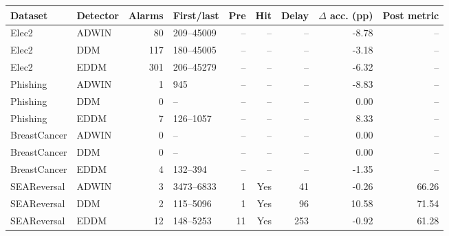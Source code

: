 \begin{tabular}{llrlrrrrr}
\toprule
Dataset & Detector & Alarms & First/last & Pre & Hit & Delay & $\Delta$ acc. (pp) & Post metric \\
\midrule
Elec2 & ADWIN & 80 & 209--45009 & -- & -- & -- & -8.78 & -- \\
Elec2 & DDM & 117 & 180--45005 & -- & -- & -- & -3.18 & -- \\
Elec2 & EDDM & 301 & 206--45279 & -- & -- & -- & -6.32 & -- \\
Phishing & ADWIN & 1 & 945 & -- & -- & -- & -8.83 & -- \\
Phishing & DDM & 0 & -- & -- & -- & -- & 0.00 & -- \\
Phishing & EDDM & 7 & 126--1057 & -- & -- & -- & 8.33 & -- \\
BreastCancer & ADWIN & 0 & -- & -- & -- & -- & 0.00 & -- \\
BreastCancer & DDM & 0 & -- & -- & -- & -- & 0.00 & -- \\
BreastCancer & EDDM & 4 & 132--394 & -- & -- & -- & -1.35 & -- \\
SEAReversal & ADWIN & 3 & 3473--6833 & 1 & Yes & 41 & -0.26 & 66.26 \\
SEAReversal & DDM & 2 & 115--5096 & 1 & Yes & 96 & 10.58 & 71.54 \\
SEAReversal & EDDM & 12 & 148--5253 & 11 & Yes & 253 & -0.92 & 61.28 \\
\bottomrule
\end{tabular}
